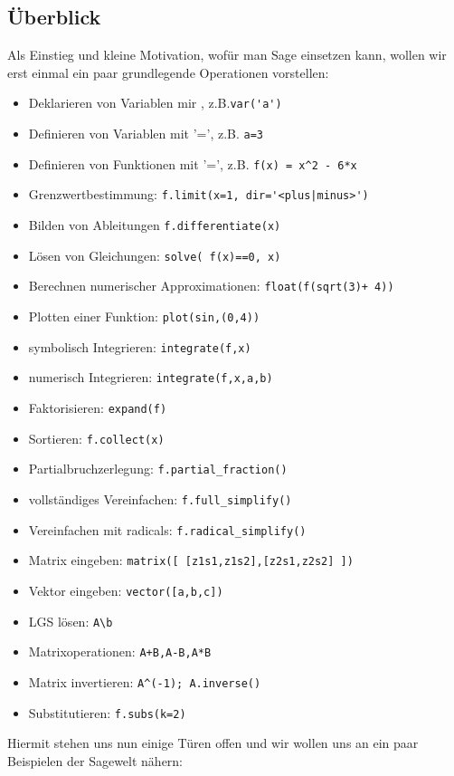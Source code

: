 \documentclass[fontsize=12pt,paper=a4,twoside,bibtotoc,idxtotoc,
liststotoc,pagesize,BCOR1.2cm,DIV15,chapterprefix,pagesize=pdftex]{scrbook}
\begin{document}
\subsection{Überblick}

Als Einstieg und kleine Motivation, wofür man Sage einsetzen kann, wollen wir erst einmal ein paar grundlegende Operationen 
vorstellen:
\begin{itemize}
 \item Deklarieren von Variablen mir , z.B.{\verb~var('a')~} 
 \item Definieren von Variablen mit {\color{blue}'='}, z.B. {\verb~a=3~} 
 \item Definieren von Funktionen mit{\color{blue} '='}, z.B. {\verb~f(x) = x^2 - 6*x~}
 \item Grenzwertbestimmung: {\color{blue}   \verb~f.limit(x=1, dir='<plus|minus>')~}
 \item Bilden von Ableitungen {\color{blue} \verb~f.differentiate(x)~}
 \item Lösen von Gleichungen: {\color{blue} \verb~solve( f(x)==0, x)~}
 \item Berechnen numerischer Approximationen: {\color{blue} \verb~float(f(sqrt(3)+ 4))~}
 \item Plotten einer Funktion: {\color{blue} \verb~plot(sin,(0,4))~}
 \item symbolisch Integrieren: {\color{blue} \verb~integrate(f,x)~}
 \item numerisch Integrieren: {\color{blue} \verb~integrate(f,x,a,b)~}
 \item Faktorisieren: {\color{blue} \verb~expand(f)~}
 \item Sortieren: {\color{blue} \verb~f.collect(x)~}
 \item Partialbruchzerlegung: {\color{blue} \verb~f.partial_fraction()~}
 \item vollständiges Vereinfachen: {\color{blue} \verb~f.full_simplify()~}
 \item Vereinfachen mit radicals: {\color{blue} \verb~f.radical_simplify()~}
 \item Matrix eingeben: {\color{blue} \verb~matrix([ [z1s1,z1s2],[z2s1,z2s2] ])~}
 \item Vektor eingeben: {\color{blue} \verb~vector([a,b,c])~}
 \item LGS lösen: {\color{blue} \verb~A\b~}
 \item Matrixoperationen: {\color{blue} \verb~A+B,A-B,A*B~}
 \item Matrix invertieren: {\color{blue} \verb~A^(-1); A.inverse()~}
 \item Substitutieren: {\color{blue} \verb~f.subs(k=2)~}
\end{itemize}
Hiermit stehen uns nun einige Türen offen und wir wollen uns an ein paar Beispielen der Sagewelt nähern:\newpage
\end{document}
